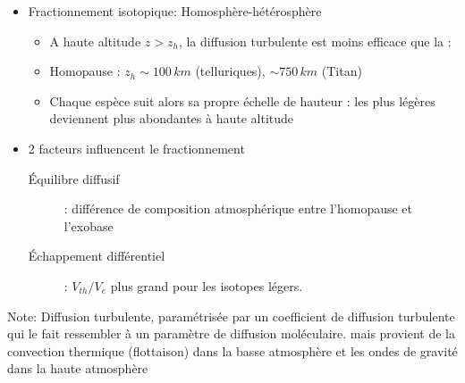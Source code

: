 \begin{itemize}
\item Fractionnement isotopique: Homosphère-hétérosphère
\begin{itemize}
\item A haute altitude $z>z_h$, la diffusion turbulente est moins efficace que la  : 
\item Homopause : $z_h \sim 100\,km$ (telluriques), $\sim 750\,km$ (Titan)
\item Chaque espèce suit alors sa propre échelle de hauteur : les plus légères deviennent plus abondantes à haute altitude
\end{itemize}
\item 2 facteurs influencent le fractionnement
{\footnotesize \begin{description}
\item[\'Equilibre diffusif] : différence de composition atmosphérique entre l'homopause et l'exobase
\item[\'Echappement différentiel] : $V_{th}/V_e$ plus grand pour les isotopes légers.
\end{description} }
\end{itemize}


Note: Diffusion turbulente, paramétrisée par un coefficient de diffusion turbulente qui le fait ressembler à un paramètre de diffusion moléculaire.
mais provient de la convection thermique (flottaison) dans la basse atmosphère et les ondes de gravité dans la haute atmosphère
